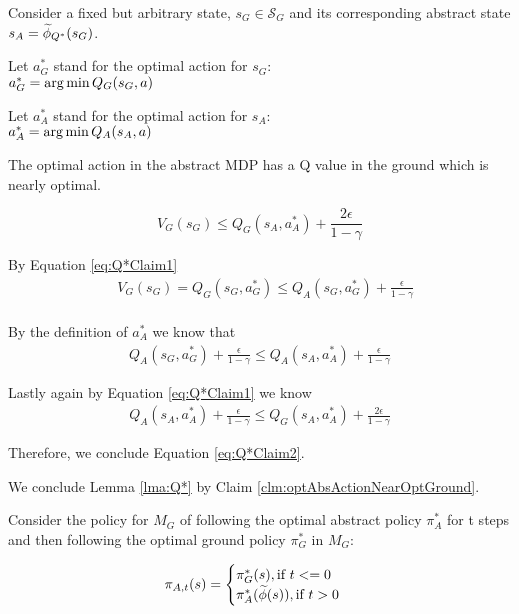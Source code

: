 Consider a fixed but arbitrary state, $s_G \in \mathcal{S}_G$ and its corresponding abstract state $s_A=\widetilde \phi_{Q^*}(s_G)$.

Let $a^*_G$ stand for the optimal action for $s_G$: \\
$a^*_G = \operatorname*{arg\,min} Q_G(s_G, a)$

Let $a^*_A$ stand for the optimal action for $s_A$:\\
 $a^*_A = \operatorname*{arg\,min} Q_A(s_A, a)$

\begin{clm}
\label{clm:optAbsActionNearOptGround}
The optimal action in the abstract MDP has a Q value in the ground which is nearly optimal.
\end{clm}

\begin{equation}
\label{eq:Q*Claim2}
V_G(s_G) \leq Q_G(s_A, a^*_A) + \frac{2\epsilon}{1-\gamma}
\end{equation}


By Equation \ref{eq:Q*Claim1}
\begin{align}
&V_G(s_G) = Q_G(s_G, a^*_G) \leq Q_A(s_G, a^*_G) + \frac{\epsilon}{1-\gamma} \\
\label{eq:Q*OptActionResult}
\end{align}

 By the definition of $a^*_A$ we know that 
 \begin{align}
Q_A(s_G, a^*_G) + \frac{\epsilon}{1-\gamma} \leq Q_A(s_A, a^*_A) + \frac{\epsilon}{1-\gamma}
\end{align}

Lastly again by Equation \ref{eq:Q*Claim1} we know
\begin{align}
Q_A(s_A, a^*_A) + \frac{\epsilon}{1-\gamma} \leq Q_G(s_A, a^*_A) + \frac{2\epsilon}{1-\gamma}
\end{align}

Therefore, we conclude Equation \ref{eq:Q*Claim2}.

\begin{clm}
We conclude Lemma \ref{lma:Q*} by Claim \ref{clm:optAbsActionNearOptGround}.
\end{clm}

Consider the policy for $M_G$ of following the optimal abstract policy $\pi^*_A$ for t steps and then following the optimal ground policy $\pi^*_G$ in $M_G$:

\begin{equation}
\pi_{A,t}(s)=
\begin{cases}
\pi_G^*(s), \text{if $t<=0$}\\
\pi_A^*(\widetilde \phi(s)), \text{if $t > 0$}\\
\end{cases}
\end{equation}

